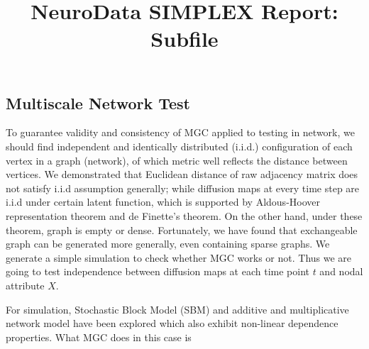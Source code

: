 \documentclass[simplex.tex]{subfiles}
\title{NeuroData SIMPLEX Report: Subfile}
\begin{document}

\subsection{Multiscale Network Test}


To guarantee validity and consistency of MGC applied to testing in
network, we should find independent and identically distributed (i.i.d.)
configuration of each vertex in a graph (network), of which metric well
reflects the distance between vertices. We demonstrated that Euclidean
distance of raw adjacency matrix does not satisfy i.i.d assumption
generally; while diffusion maps at every time step are i.i.d under
certain latent function, which is supported by Aldous-Hoover
representation theorem and de Finette’s theorem. On the other hand,
under these theorem, graph is empty or dense. Fortunately, we have found
that exchangeable graph can be generated more generally, even containing
sparse graphs. We generate a simple simulation to check whether MGC
works or not. Thus we are going to test independence between diffusion
maps at each time point $t$ and nodal attribute $X$. 

For simulation, Stochastic Block Model (SBM) and additive and multiplicative network model have been explored which also exhibit non-linear dependence properties. What MGC does in this case is 
\end{document}
